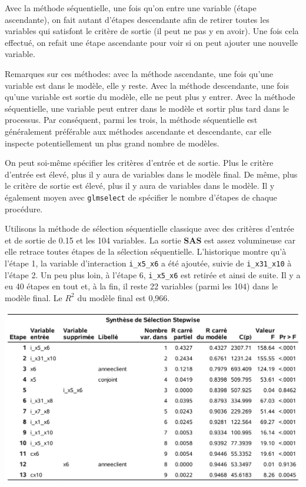 \documentclass[
  11pt,
  letterpaper,
]{book}
\theoremstyle{definition}
\theoremstyle{definition}
\theoremstyle{definition}
\theoremstyle{remark}
\begin{document}
Avec la méthode séquentielle, une fois qu'on entre une variable (étape ascendante), on fait autant d'étapes descendante afin de retirer toutes les variables qui satisfont le critère de sortie (il peut ne pas y en avoir). Une fois cela effectué, on refait une étape ascendante pour voir si on peut ajouter une nouvelle variable.

Remarques sur ces méthodes: avec la méthode ascendante, une fois qu'une variable est dans le modèle, elle y reste. Avec la méthode descendante, une fois qu'une variable est sortie du modèle, elle ne peut plus y entrer. Avec la méthode séquentielle, une variable peut entrer dans le modèle et sortir plus tard dans le processus. Par conséquent, parmi les trois, la méthode séquentielle est généralement préférable aux méthodes ascendante et descendante, car elle inspecte potentiellement un plus grand nombre de modèles.

On peut soi-même spécifier les critères d'entrée et de sortie. Plus le critère d'entrée est élevé, plus il y aura de variables dans le modèle final. De même, plus le critère de sortie est élevé, plus il y aura de variables dans le modèle. Il y également moyen avec \texttt{glmselect} de spécifier le nombre d'étapes de chaque procédure.

Utilisons la méthode de sélection séquentielle classique avec des critères d'entrée et de sortie de 0.15 et les 104 variables.
La sortie \textbf{SAS} est assez volumineuse car elle retrace toutes étapes de la sélection séquentielle. L'historique montre qu'à l'étape 1, la variable d'interaction \texttt{i\_x5\_x6} a été ajoutée, suivie de \texttt{i\_x31\_x10} à l'étape 2. Un peu plus loin, à l'étape 6, \texttt{i\_x5\_x6} est retirée et ainsi de suite. Il y a eu 40 étapes en tout et, à la fin, il reste 22 variables (parmi les 104) dans le modèle final. Le \(R^2\) du modèle final est 0,966.

\begin{center}\includegraphics[width=0.9\linewidth]{figures/02-select-e8} \end{center}
\end{document}
